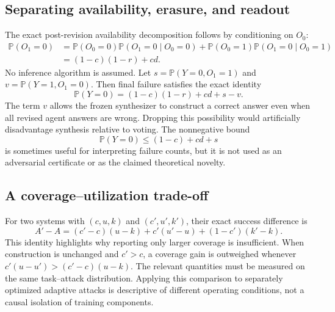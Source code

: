 \documentclass[10pt,twocolumn]{article}
\newcommand{\Prob}{\mathbb{P}}
\begin{document}
\subsection{Separating availability, erasure, and readout}
The exact post-revision availability decomposition follows by conditioning on $O_0$:
\begin{align}
 \Prob(O_1=0)
 &=\Prob(O_0=0)\Prob(O_1=0\mid O_0=0)
   +\Prob(O_0=1)\Prob(O_1=0\mid O_0=1)\\
 &=(1-c)(1-r)+cd.
\end{align}
No inference algorithm is assumed. Let $s=\Prob(Y=0,O_1=1)$ and $v=\Prob(Y=1,O_1=0)$. Then final failure satisfies the exact identity
\begin{equation}
 \Prob(Y=0)=(1-c)(1-r)+cd+s-v.
 \label{eq:full-failure}
\end{equation}
The term $v$ allows the frozen synthesizer to construct a correct answer even when all revised agent answers are wrong. Dropping this possibility would artificially disadvantage synthesis relative to voting. The nonnegative bound
\begin{equation}
 \Prob(Y=0)\leq (1-c)+cd+s
\end{equation}
is sometimes useful for interpreting failure counts, but it is not used as an adversarial certificate or as the claimed theoretical novelty.

\subsection{A coverage--utilization trade-off}
For two systems with $(c,u,k)$ and $(c',u',k')$, their exact success difference is
\begin{equation}
 A'-A=(c'-c)(u-k)+c'(u'-u)+(1-c')(k'-k).
\end{equation}
This identity highlights why reporting only larger coverage is insufficient. When construction is unchanged and $c'>c$, a coverage gain is outweighed whenever $c'(u-u')>(c'-c)(u-k)$. The relevant quantities must be measured on the same task--attack distribution. Applying this comparison to separately optimized adaptive attacks is descriptive of different operating conditions, not a causal isolation of training components.
\end{document}
